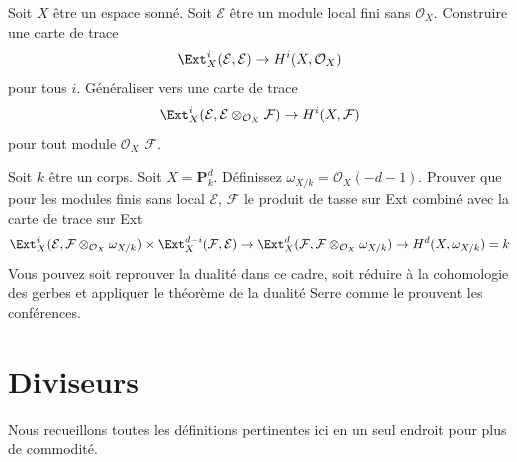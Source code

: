 \begin{exercise}
\label{exercise-trace-on-ext}
Soit $X$ être un espace sonné. Soit $\mathcal{E}$ être un module local
fini sans $\mathcal{O}_X$. Construire une carte de trace
$$
\Ext^i_X(\mathcal{E}, \mathcal{E}) \to H^i(X, \mathcal{O}_X)
$$
pour tous $i$. Généraliser vers une carte de trace
$$
\Ext^i_X(\mathcal{E}, \mathcal{E} \otimes_{\mathcal{O}_X} \mathcal{F})
\to H^i(X, \mathcal{F})
$$
pour tout module $\mathcal{O}_X$ $\mathcal{F}$.
\end{exercise}

\begin{exercise}
\label{exercise-duality}
Soit $k$ être un corps. Soit $X = \mathbf{P}^d_k$.
Définissez $\omega_{X/k} = \mathcal{O}_X(-d - 1)$. Prouver
que pour les modules finis sans local $\mathcal{E}$,
$\mathcal{F}$ le produit de tasse sur Ext combiné avec
la carte de trace sur Ext
$$
\Ext^i_X(\mathcal{E}, \mathcal{F} \otimes_{\mathcal{O}_X} \omega_{X/k})
\times
\Ext^{d - i}_X(\mathcal{F}, \mathcal{E})
\to
\Ext_X^d(\mathcal{F}, \mathcal{F} \otimes_{\mathcal{O}_X} \omega_{X/k})
\to
H^d(X, \omega_{X/k}) = k
$$
Vous pouvez soit reprouver la dualité dans ce cadre, soit réduire
à la cohomologie des gerbes et appliquer le théorème de la
dualité Serre comme le prouvent les conférences.
\end{exercise}







\section{Diviseurs}
\label{section-divisors}

\noindent
Nous recueillons toutes les définitions pertinentes ici en un seul endroit pour plus de commodité.

